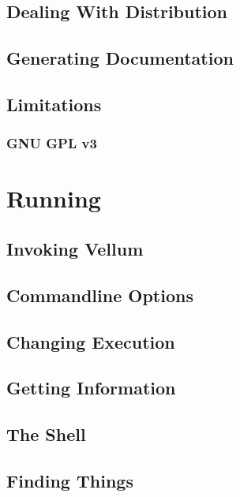 \section{Dealing With Distribution}




\section{Generating Documentation}




\section{Limitations}




\subsection{GNU GPL v3}



\chapter{Running}
\label{chapter:Running}



\section{Invoking Vellum}


\section{Commandline Options}


\section{Changing Execution}


\section{Getting Information}


\section{The Shell}


\section{Finding Things}




